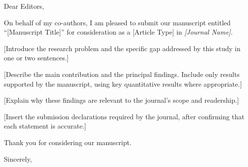 \documentclass[12pt]{QHUletter}
\date{\today}
\begin{document}
\begin{letter}{}
\opening{Dear Editors,}

On behalf of my co-authors, I am pleased to submit our manuscript entitled
``[Manuscript Title]'' for consideration as a [Article Type] in
\emph{[Journal Name]}.

[Introduce the research problem and the specific gap addressed by this study
in one or two sentences.]

[Describe the main contribution and the principal findings. Include only
results supported by the manuscript, using key quantitative results where
appropriate.]

[Explain why these findings are relevant to the journal's scope and
readership.]

[Insert the submission declarations required by the journal, after
confirming that each statement is accurate.]

Thank you for considering our manuscript.

\closing{Sincerely,}
\end{letter}
\end{document}

